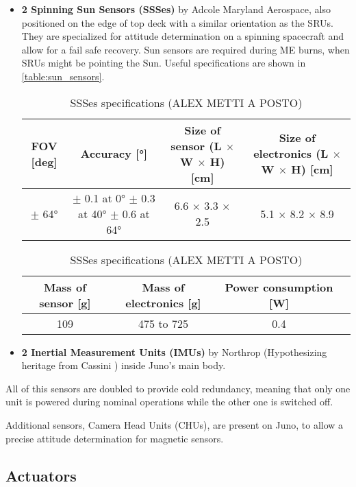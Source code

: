 \begin{itemize}
    \item \textbf{2 Spinning Sun Sensors (SSSes)} by Adcole Maryland Aerospace, also positioned on the edge of top deck with a similar orientation as the SRUs. They are specialized for attitude determination on a spinning spacecraft and allow for a fail safe recovery. Sun sensors are required during ME burns, when SRUs might be pointing the Sun. Useful specifications are shown in \autoref{table:sun_sensors}.
    
    \begin{table}[H]
        \renewcommand{\arraystretch}{1.3}
        \centering
        \begin{tabular}{|c|c|c|c|}
            \hline
            \textbf{FOV [deg]} &\textbf{Accuracy [°]} & \textbf{Size of sensor (L $\boldsymbol{\times}$ W $\boldsymbol{\times}$ H) [cm]} & \textbf{Size of electronics (L $\boldsymbol{\times}$ W $\boldsymbol{\times}$ H) [cm]} \\
            \hline
            $\pm$ 64° & $\pm$ 0.1 at 0° $\pm$ 0.3 at 40° $\pm$ 0.6 at 64°  & 6.6 $\times$ 3.3 $\times$ 2.5 & 5.1 $\times$ 8.2 $\times$ 8.9 \\   
            \hline
        \end{tabular}

        \vspace{5mm}

        \begin{tabular}{|c|c|c|c|}
            \hline
            \textbf{Mass of sensor [g]} & \textbf{Mass of electronics [g]} & \textbf{Power consumption [W]}\\
            \hline
            109 & 475 to 725 & 0.4\\
            \hline
        \end{tabular}
        \caption{SSSes specifications (ALEX METTI A POSTO)}
        \label{table:sun_sensors}
    \end{table}
 
    
    \item \textbf{2 Inertial Measurement Units (IMUs)} by Northrop (Hypothesizing heritage from Cassini \mref) inside Juno's main body. 
\end{itemize}

All of this sensors are doubled to provide cold redundancy, meaning that only one unit is powered during nominal operations while the other one is switched off. 


Additional sensors, Camera Head Units (CHUs), are present on Juno, to allow a precise attitude determination for magnetic sensors.

\subsection{Actuators}
\label{subsec:Actuators}
